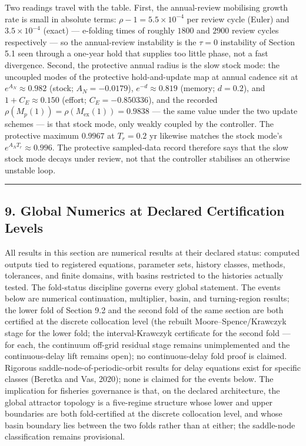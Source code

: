 \documentclass[11pt]{article}
\begin{document}
Two readings travel with the table. First, the annual-review mobilising
growth rate is small in absolute terms: \(\rho - 1 = 5.5\times10^{-4}\)
per review cycle (Euler) and \(3.5\times10^{-4}\) (exact) --- e-folding
times of roughly \(1800\) and \(2900\) review cycles respectively --- so
the annual-review instability is the \(\tau = 0\) instability of Section
5.1 seen through a one-year hold that supplies too little phase, not a
fast divergence. Second, the protective annual radius is the slow stock
mode: the uncoupled modes of the protective hold-and-update map at
annual cadence sit at \(e^{A_N} \approx 0.982\) (stock;
\(A_N = -0.0179\)), \(e^{-d} \approx 0.819\) (memory; \(d = 0.2\)), and
\(1 + C_E \approx 0.150\) (effort; \(C_E = -0.850336\)), and the
recorded \(\rho(M_p(1)) = \rho(M_{\mathrm{ex}}(1)) = 0.9838\) --- the
same value under the two update schemes --- is that stock mode, only
weakly coupled by the controller. The protective maximum \(0.9967\) at
\(T_r = 0.2\) yr likewise matches the stock mode's
\(e^{A_N T_r} \approx 0.996\). The protective sampled-data record
therefore says that the slow stock mode decays under review, not that
the controller stabilises an otherwise unstable loop.

\begin{center}\rule{0.5\linewidth}{0.5pt}\end{center}

\subsection{9. Global Numerics at Declared Certification
Levels}\label{global-numerics-at-declared-certification-levels}

All results in this section are numerical results at their declared
status: computed outputs tied to registered equations, parameter sets,
history classes, methods, tolerances, and finite domains, with basins
restricted to the histories actually tested. The fold-status discipline
governs every global statement. The events below are numerical
continuation, multiplier, basin, and turning-region results; the lower
fold of Section 9.2 and the second fold of the same section are both
certified at the discrete collocation level (the rebuilt
Moore--Spence/Krawczyk stage for the lower fold; the interval-Krawczyk
certificate for the second fold --- for each, the continuum off-grid
residual stage remains unimplemented and the continuous-delay lift
remains open); no continuous-delay fold proof is claimed. Rigorous
saddle-node-of-periodic-orbit results for delay equations exist for
specific classes (Beretka and Vas, 2020); none is claimed for the events
below. The implication for fisheries governance is that, on the declared
architecture, the global attractor topology is a five-regime structure
whose lower and upper boundaries are both fold-certified at the discrete
collocation level, and whose basin boundary lies between the two folds
rather than at either; the saddle-node classification remains
provisional.
\end{document}
